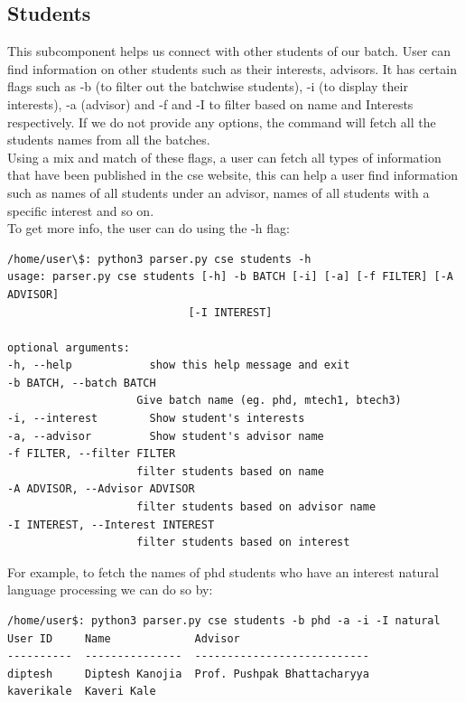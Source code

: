 \documentclass[12pt, letterpaper, twoside]{article}
\begin{document}
\subsection{Students}
This subcomponent helps us connect with other students of our batch. 
User can find information on other students such as their interests, advisors.
It has certain flags such as -b (to filter out the batchwise students), -i (to display their interests), -a (advisor)
and -f and -I to filter based on name and Interests respectively.
If we do not provide any options, the command will fetch all the students names from all the batches.\\
Using a mix and match of these flags, a user can fetch all types of information
that have been published in the cse website, this can help a user find information such as names of all students
under an advisor, names of all students with a specific interest and so on.\\
To get more info, the user can do using the -h flag:
\begin{verbatim}
/home/user\$: python3 parser.py cse students -h
usage: parser.py cse students [-h] -b BATCH [-i] [-a] [-f FILTER] [-A ADVISOR]
                            [-I INTEREST]

optional arguments:
-h, --help            show this help message and exit
-b BATCH, --batch BATCH
                    Give batch name (eg. phd, mtech1, btech3)
-i, --interest        Show student's interests
-a, --advisor         Show student's advisor name
-f FILTER, --filter FILTER
                    filter students based on name
-A ADVISOR, --Advisor ADVISOR
                    filter students based on advisor name
-I INTEREST, --Interest INTEREST
                    filter students based on interest
\end{verbatim}
For example, to fetch the names of phd students who have an interest natural language processing
we can do so by:\\
\begin{verbatim}
/home/user$: python3 parser.py cse students -b phd -a -i -I natural
User ID     Name             Advisor                      
----------  ---------------  ---------------------------  
diptesh     Diptesh Kanojia  Prof. Pushpak Bhattacharyya  
kaverikale  Kaveri Kale                                   
\end{verbatim}
\end{document}
